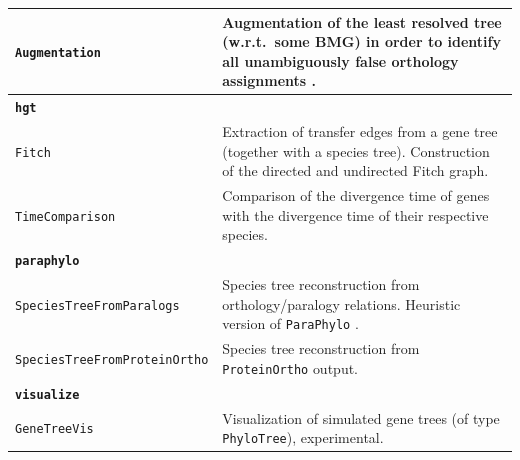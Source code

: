 \documentclass[hidelinks,11pt]{article}
\begin{document}
{\begin{longtable}{| p{4.0cm} | p{10cm} |}
	\texttt{Augmentation} &
	Augmentation of the least resolved tree (w.r.t.\ some BMG) in order to identify all unambiguously false orthology assignments \citep{schaller2020}. \\
	\hline
  \multicolumn{2}{|l|}{\textbf{\texttt{hgt}}}\\
  \hline
  \texttt{Fitch} &
  Extraction of transfer edges from a gene tree (together with a species tree). 
  Construction of the directed and undirected Fitch graph.\\
  \texttt{TimeComparison} &
  Comparison of the divergence time of genes with the divergence time of their 
  respective species. \\
	\hline
	\multicolumn{2}{|l|}{\textbf{\texttt{paraphylo}}}\\
	\hline
	\texttt{SpeciesTreeFromParalogs} &
	Species tree reconstruction from orthology/paralogy relations. Heuristic version of \texttt{ParaPhylo} \cite{hellmuth2015}. \\
	\texttt{SpeciesTreeFrom\newline ProteinOrtho} &
	Species tree reconstruction from \texttt{ProteinOrtho} \cite{lechner2011,lechner2014} output. \\
	\hline
	\multicolumn{2}{|l|}{\textbf{\texttt{visualize}}}\\
	\hline
	\texttt{GeneTreeVis} &
	Visualization of simulated gene trees (of type \texttt{PhyloTree}), experimental. \\
\end{longtable}
}
\end{document}
